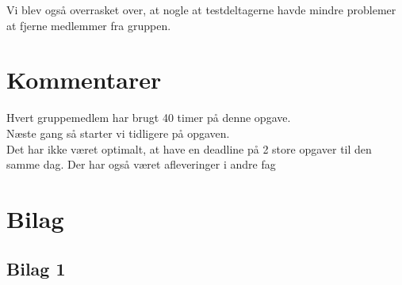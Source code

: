 \documentclass[12pt]{article}
\begin{document}
Vi blev også overrasket over, at nogle at testdeltagerne havde mindre problemer at fjerne medlemmer fra gruppen. \\


\section{Kommentarer}

Hvert gruppemedlem har brugt 40 timer på denne opgave.\\
Næste gang så starter vi tidligere på opgaven. \\
Det har ikke været optimalt, at have en deadline på 2 store opgaver til den samme dag. Der har også været afleveringer i andre fag\\


\newpage
\section{Bilag}
\subsection*{Bilag 1}
\end{document}
